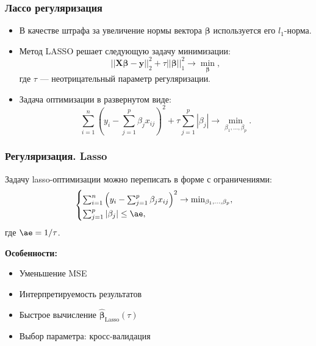 \documentclass[ucs, notheorems, handout]{beamer}
\DeclareMathOperator*{\argmin}{arg\,min}
\newcommand{\betah}{\hat{\bm \beta}}
\newcommand{\betaa}{\bm{\beta}}
\newcommand{\X}{\bm{X}}
\begin{document}
\begin{frame}
\frametitle{Лассо регуляризация}

\begin{itemize}
	\item В качестве штрафа за увеличение нормы вектора $\bm \beta$ используется его $l_{1}$-норма.
	\item Метод LASSO решает следующую задачу минимизации:
	\begin{equation*}
		||\bm{X} \bm \beta - \bm y||_{2}^{2}
		+
		\tau||\bm \beta||_{1}^{2}
		\rightarrow\min_{\bm \beta},
	\end{equation*}
	где $\tau$ --- неотрицательный параметр регуляризации.
	\item Задача оптимизации в развернутом виде:
	\begin{equation*}
		\sum_{i=1}^{n}
		\left(
		y_{i}
		-
		\sum_{j=1}^{p}\beta_{j}x_{ij}
		\right)^{2}
		+
		\tau\sum_{j=1}^{p}|\beta_{j}|
		\rightarrow\min_{\beta_{1},\ldots,\beta_{p}}.
	\end{equation*}
\end{itemize}
\end{frame}

\begin{frame}
	\frametitle{Регуляризация. Lasso}
	
	
	Задачу lasso-оптимизации можно переписать в форме с ограничениями: %
	\begin{equation*}%
		\begin{cases}
			\sum_{i=1}^{n}
			\left(
			y_{i}
			-
			\sum_{j=1}^{p}\beta_{j}x_{ij}
			\right)^{2}
			\to
			\min_{\beta_{1},\ldots,\beta_{p}},\\
			\sum_{j=1}^{p}|\beta_{j}|\leq\ae,
		\end{cases}
	\end{equation*}
	где $\ae=1/\tau$.


	\textbf{
		Особенности:
	}
	\begin{itemize}
		\item Уменьшение MSE
		\item Интерпретируемость результатов
		\item Быстрое вычисление $\betah_\text{Lasso}(\tau)$
		\item Выбор параметра: кросс-валидация
	\end{itemize}
	\note{
	}
\end{frame}
\end{document}
